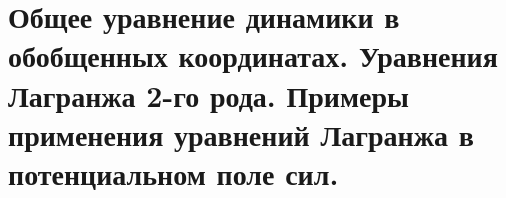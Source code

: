 \chapter{Общее уравнение динамики в обобщенных координатах. Уравнения Лагранжа
2-го рода. Примеры применения уравнений Лагранжа в потенциальном поле сил.}

\newpage
